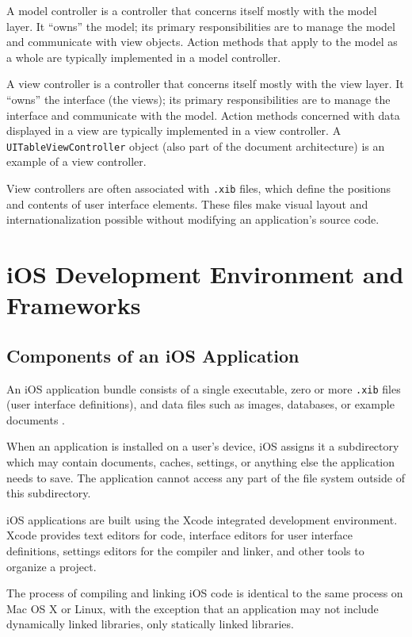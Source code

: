 A model controller is a controller that concerns itself mostly with the model
layer. It “owns” the model; its primary responsibilities are to manage the model
and communicate with view objects. Action methods that apply to the model as a
whole are typically implemented in a model controller.

A view controller is a controller that concerns itself mostly with the view
layer. It “owns” the interface (the views); its primary responsibilities are to
manage the interface and communicate with the model. Action methods concerned
with data displayed in a view are typically implemented in a view controller. A
\texttt{UITableViewController} object (also part of the document architecture)
is an example of a view controller.

View controllers are often associated with \texttt{.xib} files, which define the
positions and contents of user interface elements. These files make visual
layout and internationalization possible without modifying an application's
source code.

\section{iOS Development Environment and Frameworks}
\label{sect:ios_dev_env}

\subsection{Components of an iOS Application}

An iOS application bundle consists of a single executable, zero or more
\texttt{.xib} files (user interface definitions), and data files such as images,
databases, or example documents \cite{ios:application-programming-guide}.

When an application is installed on a user's device, iOS assigns it a
subdirectory which may contain documents, caches, settings, or anything else the
application needs to save. The application cannot access any part of the file
system outside of this subdirectory.

iOS applications are built using the Xcode integrated development environment.
Xcode provides text editors for code, interface editors for user interface
definitions, settings editors for the compiler and linker, and other tools to
organize a project.

The process of compiling and linking iOS code is identical to the same process
on Mac OS X or Linux, with the exception that an application may not include
dynamically linked libraries, only statically linked libraries.

